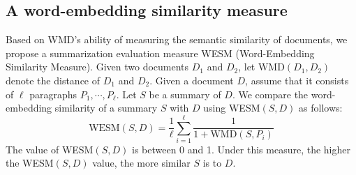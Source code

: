\documentclass[a4paper,twoside]{article}
\begin{document}
\begin{comment}
 \begin{figure}[h]
\texttt{[image: fig4.png]}
\caption{The WMD metric on two sentences S1, S2 compared with the query sentence Q \cite{wmd}}%
\label{fig:fig4}
\end{figure}
Figure \ref{fig:fig4}, extracted from \cite{wmd}, shows an example of the WMD metric on two sentences $S_1$, $S_2$ compared with the query sentence $Q$.
The arrows represent flow between two words, which are labeled with their distance costs.
For each sentence, stop words are removed. Comparing the main components one by one and adding their distance contributions together, we obtain the WMD of two sentences. The lower the value of WMD, the more similar two sentences are. Intuitively, traveling from $Illinois$ to $Chicago$ is much closer than is $Japan$ to $Chicago$. Also, Word2Vec embedding generates the vector vec ($Illinois$) closer vec ($Chicago$) than vec ($Japan$). Thus, sentence $S_1$ to query $Q$ is more similar than sentence $S_2$ to query $Q$.
\end{comment}

\subsection{A word-embedding similarity measure}

Based on WMD's ability of measuring the semantic similarity of documents, %
we propose a summarization evaluation measure WESM (Word-Embedding Similarity Measure). %
Given two documents $D_1$ and $D_2$, let $\mbox{WMD}(D_1,D_2)$ denote
the distance of $D_1$ and $D_2$.
Given a document $D$, assume that it consists of $\ell$ paragraphs $P_1, \cdots, P_\ell$.
Let $S$ be a summary of $D$.
We compare the word-embedding similarity of a summary $S$ with $D$ using WESM$(S,D)$ as follows:
\begin{equation} \label{eq6}
\mbox{WESM}(S,D) = \frac{1}{\ell}\sum_{i=1}^{\ell} \frac{1}{1 + \mbox{WMD}(S,P_i)}
\end{equation}
The value of WESM$(S,D)$ %
is between 0 and 1. Under this measure, the higher the WESM$(S,D)$ value, the more similar $S$ is to $D$. %
\end{document}

